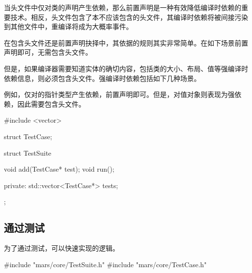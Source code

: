 \begin{content}
\begin{story}
\begin{content}

当头文件中仅对类的声明产生依赖，那么前置声明是一种有效降低编译时依赖的重要技术。相反，头文件包含了本不应该包含的头文件，其编译时依赖将被间接污染到其他文件中，重编译将成为大概率事件。

在包含头文件还是前置声明抉择中，其依据的规则其实非常简单。在如下场景前置声明即可，无需包含头文件。

\begin{enum}
\end{enum}

但是，如果编译器需要知道实体的确切内容，包括类的大小、布局、值等强编译时依赖信息，则必须包含头文件。强编译时依赖包括如下几种场景。

\begin{enum}
\end{enum}

例如，仅对的指针类型产生依赖，前置声明即可。但是，对值对象则表现为强依赖，因此需要包含头文件。

\begin{leftbar}
 \begin{c++}[caption={\ttfamily{include/mars/core/TestSuite.h}}]
#include <vector>

struct TestCase;

struct TestSuite {
  void add(TestCase* test);
  void run();

private:
  std::vector<TestCase*> tests;
};
 \end{c++}
\end{leftbar}

\end{content}

\end{story}

\subsection{通过测试}

为了通过测试，可以快速实现的逻辑。

\begin{leftbar}
 \begin{c++}[caption={\ttfamily{src/mars/core/TestSuite.cc}}]
#include "mars/core/TestSuite.h"
#include "mars/core/TestCase.h"


\end{c++}
\end{leftbar}
\end{content}
